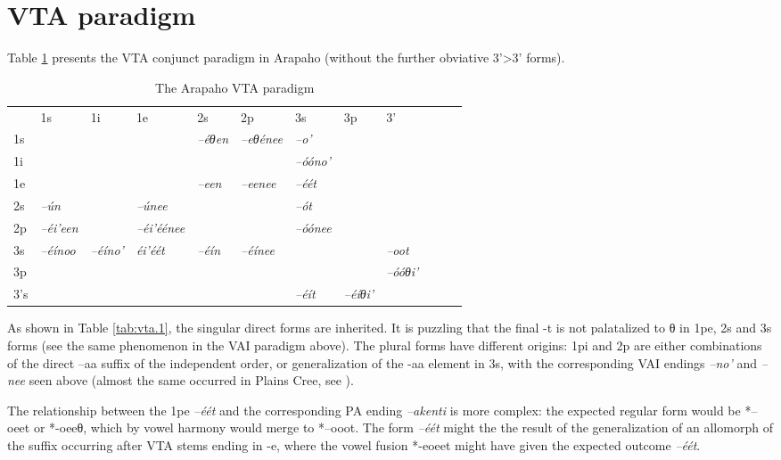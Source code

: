 \documentclass[twoside,a4paper,11pt]{article}
\newcommand{\ipa}[1]{{\phon\textit{#1}}}
\newcommand{\grise}[1]{\cellcolor{lightgray}\textbf{#1}}
\newcommand{\Σ}{\greek{Σ}}
\begin{document}
\section{VTA paradigm}
Table \ref{tab:vta} presents the VTA conjunct paradigm in Arapaho (without the further obviative 3'>3' forms).
\begin{table}[H]
\caption{The Arapaho VTA paradigm}
\centering \label{tab:vta}
\begin{tabular}{llllllllllll}
\toprule
 & 	1s & 	1i & 	1e & 	2s & 	2p & 	3s & 	3p & 	3' & 	\\
1s & \grise{} & 	\grise{} & 	\grise{} & 	\ipa{--éθen} & 	\ipa{--eθénee} & 	\ipa{--o'} & 	\ipa{} & 	\ipa{} & 	\\
1i & 	\grise{} & 	\grise{} & 	\grise{} & 	\grise{} & 	\grise{} & 	\ipa{--óóno'} & 	\ipa{} & 	\ipa{} & 	\\
1e & 	\grise{} & 	\grise{} & 	\grise{} & 	\ipa{--een} & 	\ipa{--eenee} & 	\ipa{--éét} & 	\ipa{} & 	\ipa{} & 	\\
2s & 	\ipa{--ún} & 	\grise{} & 	\ipa{--únee} & 	\grise{} & 	\grise{} & 	\ipa{--ót} & 	\ipa{} & 	\ipa{} & 	\\
2p & 	\ipa{--éi'een} & 	\grise{} & 	\ipa{--éi'éénee} & 	\grise{} & 	\grise{} & 	\ipa{--óónee} & 	\ipa{} & 	\ipa{} & 	\\
3s & 	\ipa{--éínoo} & 	\ipa{--éíno'} & 	\ipa{éi'éét} & 	\ipa{--éín} & 	\ipa{--éínee} & 	\grise{} & 	\grise{} & 	\ipa{--oot} & 	\\
3p & 	\ipa{} & 	\ipa{} & 	\ipa{} & 	\ipa{} & 	\ipa{} & 	\grise{} & 	\grise{} & 	\ipa{--óóθi'} & 	\\
3's & 	\ipa{} & 	\ipa{} & 	\ipa{} & 	\ipa{} & 	\ipa{} & 	\ipa{--éít} & 	\ipa{--éíθi'} &   & 	\\
\bottomrule
\end{tabular}
\end{table}

As shown in Table \ref{tab:vta.1}, the singular   direct forms   are inherited. It is puzzling that the final -t is not palatalized to θ in 1pe, 2s and 3s forms (see the same phenomenon in the VAI paradigm above). The plural forms have different origins: 1pi and 2p are either  combinations of the direct --aa suffix of the independent order, or generalization of the -aa element in 3s, with the corresponding VAI endings \ipa{--no'} and \ipa{--nee} seen above (almost the same occurred in Plains Cree, see \citealt{dahlstrom89change}).

The relationship between the 1pe \ipa{--éét} and the corresponding PA ending \ipa{--akenti} is more complex: the expected regular form would be *--oeet or *-oeeθ, which by vowel harmony would merge to *--ooot. The form 	\ipa{--éét} might the the result of the generalization of an allomorph of the suffix occurring after VTA stems ending in -e, where the vowel fusion *-eoeet might have given the expected outcome  \ipa{--éét}.
\end{document}
